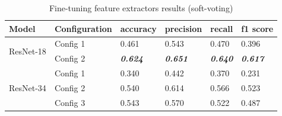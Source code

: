 \documentclass[
11pt, %
english, %
singlespacing, %
headsepline, %
]{project_structure}
\newcommand{\subpar}[1]{\paragraph*{#1}}
\begin{document}
\begin{table}[H]
\centering
\label{tab:resnet_hyperparameters_4}
\begin{tabular}{@{}llllll@{}}
\toprule
\textbf{Model} & \textbf{Configuration} & \textbf{accuracy} & \textbf{precision} & \textbf{recall} & \textbf{f1 score} \\
\midrule
\multirow{2}{*}{\acrshort{ResNet}-18} & \multicolumn{1}{l}{\acrshort{Config} 1} & \multicolumn{1}{l}{0.461} & \multicolumn{1}{l}{0.543} & \multicolumn{1}{l}{0.470} & \multicolumn{1}{l}{0.396} \\
 &  
 \multicolumn{1}{l}{\acrshort{Config} 2} & \multicolumn{1}{l}{\textbf{\textit{0.624}}} & \multicolumn{1}{l}{\textbf{\textit{0.651}}} & \multicolumn{1}{l}{\textbf{\textit{0.640}}} & \multicolumn{1}{l}{\textbf{\textit{0.617}}} \\
 \midrule
 \multirow{3}{*}{\acrshort{ResNet}-34} & \multicolumn{1}{l}{\acrshort{Config} 1} & \multicolumn{1}{l}{0.340} & \multicolumn{1}{l}{0.442} & \multicolumn{1}{l}{0.370} & \multicolumn{1}{l}{0.231} \\
 & \multicolumn{1}{l}{\acrshort{Config} 2} & \multicolumn{1}{l}{0.540} & \multicolumn{1}{l}{0.614} & \multicolumn{1}{l}{0.566} & \multicolumn{1}{l}{0.523} \\
 & \multicolumn{1}{l}{\acrshort{Config} 3} & \multicolumn{1}{l}{0.543} & \multicolumn{1}{l}{0.570} & \multicolumn{1}{l}{0.522} & \multicolumn{1}{l}{0.487} \\
\bottomrule

\end{tabular}
\caption{Fine-tuning feature extractors results (soft-voting)}
\label{tab:fine_tuning_results_rois_soft}
\end{table}

\end{document}
